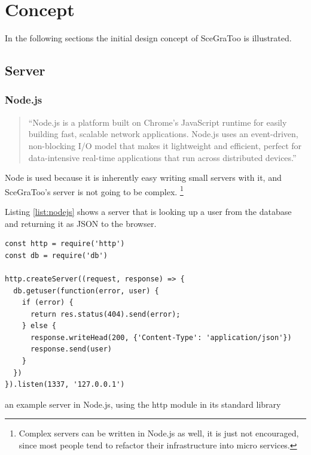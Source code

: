 
\section{Concept}
\label{concept}


In the following sections the initial design concept of \gls{SceGraToo} is illustrated.

\subsection{Server}
\label{server}

\subsubsection{Node.js}
\begin{quote}
  ``Node.js is a platform built on Chrome's JavaScript runtime for easily building fast, scalable network applications. Node.js uses an event-driven, non-blocking I/O model that makes it lightweight and efficient, perfect for data-intensive real-time applications that run across distributed devices.'' \cite{nodejs}
\end{quote}

Node is used because it is inherently easy writing small servers with it, and
SceGraToo's server is not going to be complex. \footnote{Complex servers can be
written in Node.js as well, it is just not encouraged, since most people tend to
refactor their infrastructure into micro services.}

Listing \ref{list:nodejs} shows a server that is looking up a user from the database and returning it as \gls{JSON} to the browser.

\begin{listing}
  \begin{verbatim}
const http = require('http')
const db = require('db')

http.createServer((request, response) => {
  db.getuser(function(error, user) {
    if (error) {
      return res.status(404).send(error);
    } else {
      response.writeHead(200, {'Content-Type': 'application/json'})
      response.send(user)
    }
  })
}).listen(1337, '127.0.0.1')
  \end{verbatim}
  \caption{an example server in Node.js, using the http module in its standard library}
  \label{list:nodejs}
\end{listing}

